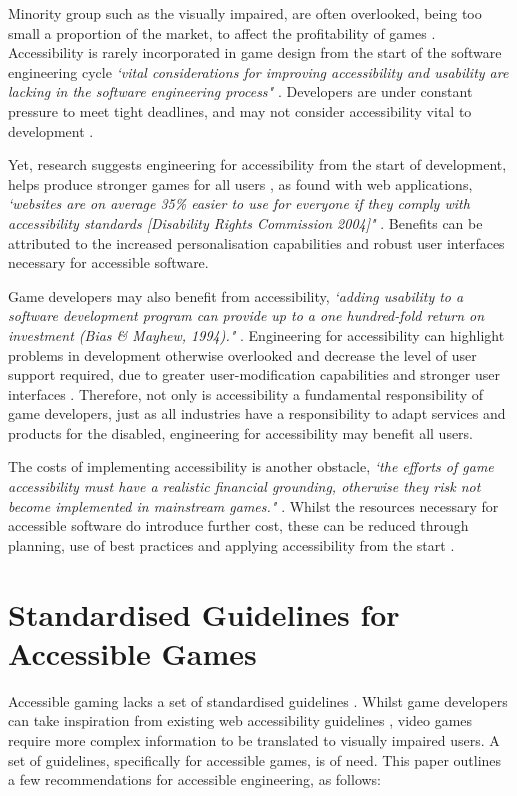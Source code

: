 \documentclass{scrartcl}
\begin{document}
Minority group such as the visually impaired, are often overlooked, being too small a proportion of the market, to affect the profitability of games \cite{16}. Accessibility is rarely incorporated in game design from the start of the software engineering cycle \textit{`vital considerations for improving accessibility and usability are lacking in the software engineering process"} \cite{15}. Developers are under constant pressure to meet tight deadlines, and may not consider accessibility vital to development \cite{3} \cite{10}. 

Yet, research suggests engineering for accessibility from the start of development, helps produce stronger games for all users \cite{5}, as found with web applications, \textit{`websites are on average 35\% easier to use for everyone if they comply with accessibility standards [Disability Rights Commission 2004]"} \cite{5}. Benefits can be attributed to the increased personalisation capabilities and robust user interfaces necessary for accessible software. 

Game developers may also benefit from accessibility, \textit{`adding usability to a software development program can provide up to a one hundred-fold return on investment (Bias \& Mayhew, 1994)."} \cite{17} \cite{20}. Engineering for accessibility can highlight problems in development otherwise overlooked and decrease the level of user support required, due to greater user-modification capabilities and stronger user interfaces \cite{17}. Therefore, not only is accessibility a fundamental responsibility of game developers, just as all industries have a responsibility to adapt services and products for the disabled, engineering for accessibility may benefit all users. 

The costs of implementing accessibility is another obstacle, \textit{`the efforts of game accessibility must have a realistic financial grounding, otherwise they risk not become implemented in mainstream games."} \cite{14}. Whilst the resources necessary for accessible software do introduce further cost, these can be reduced through planning, use of best practices and applying accessibility from the start \cite{17}. 

\section{Standardised Guidelines for Accessible Games}

Accessible gaming lacks a set of standardised guidelines \cite{18}. Whilst game developers can take inspiration from existing web accessibility guidelines \cite{18}, video games require more complex information to be translated to visually impaired users. A set of guidelines, specifically for accessible games, is of need. This paper outlines a few recommendations for accessible engineering, as follows:
\end{document}
